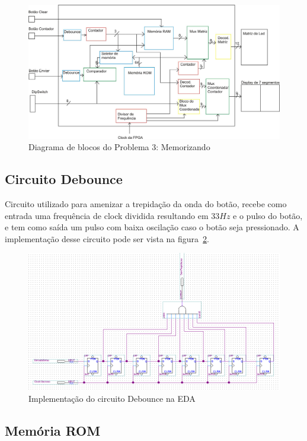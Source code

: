 \documentclass[12pt]{article}
\begin{document}
\begin{figure}[H]
\centering
\includegraphics[width=1\textwidth]{img/diagrama.jpg}
\caption{Diagrama de blocos do Problema 3: Memorizando}
\label{fig:diagrama}
\end{figure}



\subsection{Circuito Debounce}
Circuito utilizado para amenizar a trepidação da onda do botão, recebe como entrada uma frequência de clock dividida resultando em 33$Hz$ e o pulso do botão, e tem como saída um pulso com baixa oscilação caso o botão seja pressionado. A implementação desse circuito pode ser vista na figura~\ref{fig:debounce}.

\begin{figure}[!htbp]
\centering
\includegraphics[width=.7\textwidth]{img/debounce.png}
\caption{Implementação do circuito Debounce na EDA}
\label{fig:debounce}
\end{figure}


\subsection{Memória ROM}
\end{document}

